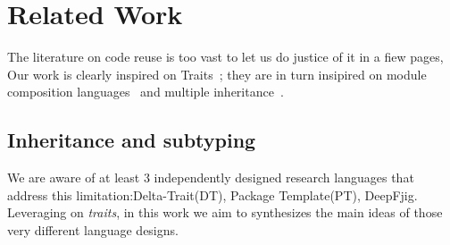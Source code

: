 
 
 
\section{Related Work}
The literature on code reuse is too vast to let us do justice of it in a fiew pages,
Our work is clearly inspired on Traits~\cite{ducasse2006traits}; they are in turn insipired on module composition languages~\cite{ancona2002calculus}
and multiple inheritance~\cite{}.

\subsection{Inheritance and subtyping}

We are aware of at least 3 independently designed research languages 
that address this limitation:Delta-Trait(DT)\cite{ferruccioworks}, Package Template(PT)\cite{}, DeepFjig\cite{}.
Leveraging on \emph{traits}, in this work we aim to synthesizes
the main ideas of those very different language designs.


